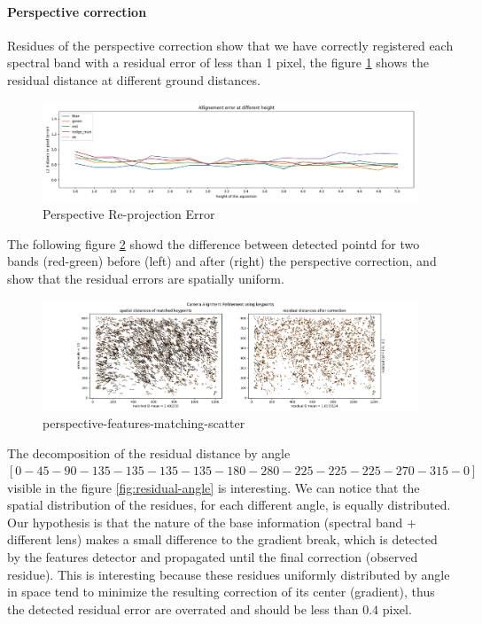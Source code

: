 \documentclass[]{elsarticle}
\begin{document}
	\paragraph{Perspective correction}
	Residues of the perspective correction show that we have correctly registered each spectral band with a residual error of less than 1 pixel,
	the figure \ref{fig:perspective-error} shows the residual distance at different ground distances.
	
	\begin{figure}[!htb]
		\centering
		\includegraphics[width=\linewidth]{../figures/prespective-allignement-rmse.jpg}
		\caption{Perspective Re-projection Error}
		\label{fig:perspective-error}
	\end{figure}
	
	The following figure \ref{fig:perspective-features-matching-scatter} showd the difference between detected pointd for two bands (red-green)
	before (left) and after (right) the perspective correction, and show that the residual errors are spatially uniform.
	
	\begin{figure}[!htb]
		\centering
		\includegraphics[width=\linewidth]{../figures/perspective-features-matching-scatter.png}
		\caption{perspective-features-matching-scatter}
		\label{fig:perspective-features-matching-scatter}
	\end{figure}
	
	
	The decomposition of the residual distance by angle $[0-45-90-135-135-135-135-180-280-225-225-225-270-315-0]$ visible in the figure \ref{fig:residual-angle} is interesting.
	We can notice that the spatial distribution of the residues, for each different angle, is equally distributed.
	Our hypothesis is that the nature of the base information (spectral band + different lens) makes a small difference to the gradient break,
	which is detected by the features detector and propagated until the final correction (observed residue).
	This is interesting because these residues uniformly distributed by angle in space tend to minimize the resulting correction of its center (gradient),
	thus the detected residual error are overrated and should be less than $0.4$ pixel.
	
\end{document}
